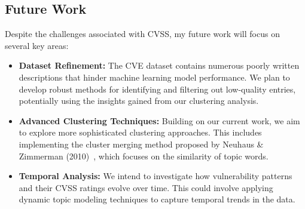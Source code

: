 \documentclass[12pt]{article}
\begin{document}





\subsection{Future Work}

Despite the challenges associated with CVSS, my future work will focus on several key areas:

\begin{itemize}

	\item \textbf{Dataset Refinement:} The CVE dataset contains numerous poorly written descriptions
	      that hinder machine learning model performance. We plan to develop robust methods for
	      identifying and filtering out low-quality entries, potentially using the insights gained
	      from our clustering analysis.

	\item \textbf{Advanced Clustering Techniques:} Building on our current work, we aim to explore
	      more sophisticated clustering approaches. This includes implementing the cluster merging
	      method proposed by Neuhaus \& Zimmerman (2010)~\cite{cve_topic_modelling}, which focuses on
	      the similarity of topic words.

	\item \textbf{Temporal Analysis:} We intend to investigate how vulnerability patterns and their
	      CVSS ratings evolve over time. This could involve applying dynamic topic modeling techniques
	      to capture temporal trends in the data.

\end{itemize}
\end{document}
